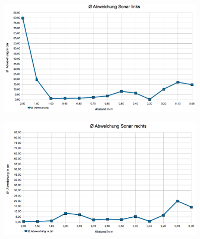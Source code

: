 \begin{figure}[ht]
    \centering
	\includegraphics[width=0.9\textwidth, angle=0]{img/nao_2.png} 
\end{figure}

\begin{figure}[ht]
    \centering
	\includegraphics[width=0.9\textwidth, angle=0]{img/nao_3.png} 
\end{figure}

